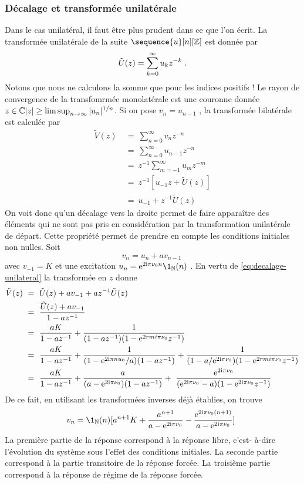 \subsubsection{D\'{e}calage et transform\'{e}e unilat\'{e}rale}
Dans le cas unilat\'{e}ral, il faut \^{e}tre plus prudent dans ce que l'on \'{e}crit. La transformée unilatérale de la suite $\sequence{u}[n][\zset]$ est donnée par
\begin{equation}
\label{eq:transformee-unilaterale}
\tilde{U}(z)= \sum_{k=0}^\infty u_k z^{-k}\;.
\end{equation}
Notons que nous ne calculons la somme que pour les indices positifs ! Le rayon de convergence de la transfomrmée monolatérale est une couronne
donnée ${z \in \mathbb{C}}{|z| \geq \limsup_{n \to \infty} |u_n|^{1/n}}$.
Si on pose $v_n=u_{n-1}$ , la transform\'{e}e bilat\'{e}rale est calcul\'{e}e par
\begin{align}
\nonumber
\tilde{V}(z)\ &=\ \sum_{n=0}^{\infty}v_nz^{-n} \\
\nonumber
&=\ \sum_{n=0}^{\infty}u_{n-1}z^{-n} \\
\nonumber
&=\ z^{-1}\sum_{m=-1}^{\infty} u_m z^{-m} \\
\nonumber
&=\ z^{-1}[u_{-1} z+\tilde{U}(z)] \\
&=\ u_{-1}+z^{-1}\tilde{U}(z)
\label{eq:decalage-unilateral}
\end{align}
On voit donc qu'un d\'{e}calage vers la droite permet de faire appara\^{i}tre des \'{e}l\'{e}ments qui ne sont pas pris en consid\'{e}ration par la transformation unilatérale de d\'{e}part. Cette propri\'{e}t\'{e} permet de prendre en compte les conditions initiales non nulles.
Soit
\[
v_n=u_n+av_{n-1}\
\]
avec $v_{-1}=K$ et une excitation $u_n=\rme^{2 \rmi \pi \nu_0 n} \1_{\nset}(n)$ . En vertu de \eqref{eq:decalage-unilateral}
la transform\'{e}e en $z$ donne
\begin{align*}
\tilde{V}(z)\ &=\ \tilde{U}(z)+av_{-1}+az^{-1}\tilde{U}(z) \\
&=\ \frac{\tilde{U}(z)+av_{-1}}{1-az^{-1}} \\
&=\ \frac{aK}{1-az^{-1}}+\frac{1}{(1-az^{-1})(1- \mathrm{e}^{2 rmi \pi \nu_{0}}z^{-1})} \\
& =\ \frac{aK}{1-az^{-1}}+\frac{1}{(1-\mathrm{e}^{2 \mathrm{i} \pi nu_{0}}/a)(1-az^{-1})}
+ \frac{1}{(1-a/\mathrm{e}^{2 \mathrm{i} \pi \nu_{0}})(1-\mathrm{e}^{2 rmi \pi \nu_{0}}z^{-1})} \\
&=\ \frac{aK}{1-az^{-1}}+\frac{a}{(a-\mathrm{e}^{2 \mathrm{i} \pi \nu_{0}})(1-az^{-1})}
+\ \frac{\mathrm{e}^{2 \mathrm{i} \pi \nu_{0}}}{(\mathrm{e}^{2 \mathrm{i} \pi \nu_{0}}-a)(1-\mathrm{e}^{2 \mathrm{i} \pi\nu_{0}}z^{-1})}
\end{align*}
De ce fait, en utilisant les transform\'{e}es inverses d\'{e}j\`{a} \'{e}tablies, on
trouve
\[
v_n=\1_\nset(n)[a^{n+1}K+\frac{a^{n+1}}{a-\rme^{2 \rmi \pi \nu_{0}}}-\frac{\rme^{2 \rmi \pi \nu_{0}(n+1)}}{a-\rme^{2 \rmi \pi \nu_{0}}}]\
\]
La premi\`{e}re partie de la r\'{e}ponse correspond \`{a} la r\'{e}ponse libre, c'est-
\`{a}-dire l'\'{e}volution du syst\`{e}me sous l'effet des conditions initiales.
La seconde partie correspond \`{a} la partie transitoire de la r\'{e}ponse
forc\'{e}e. La troisi\`{e}me partie correspond \`{a} la r\'{e}ponse de r\'{e}gime de la
r\'{e}ponse forc\'{e}e.

